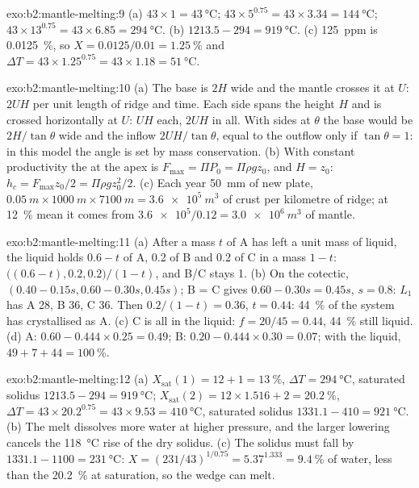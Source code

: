 \begin{solution}{exo:b2:mantle-melting:9}
(a) $43\times1 = \qty{43}{\celsius}$; $43\times5^{0.75} = 43\times3.34 =
\qty{144}{\celsius}$; $43\times13^{0.75} = 43\times6.85 = \qty{294}{\celsius}$.
(b) $1213.5 - 294 = \qty{919}{\celsius}$. (c) \qty{125}{ppm} is
\qty{0.0125}{\percent}, so $X = 0.0125/0.01 = \qty{1.25}{\percent}$ and $\Delta T =
43\times1.25^{0.75} = 43\times1.18 = \qty{51}{\celsius}$.
\end{solution}

\begin{solution}{exo:b2:mantle-melting:10}
(a) The base is $2H$ wide and the mantle crosses it at $U$: $2UH$ per unit length
of ridge and time. Each side spans the height $H$ and is crossed horizontally at
$U$: $UH$ each, $2UH$ in all. With sides at $\theta$ the base would be
$2H/\tan\theta$ wide and the inflow $2UH/\tan\theta$, equal to the outflow only if
$\tan\theta = 1$: in this model the angle is set by mass conservation. (b) With
constant productivity the  at the apex is $F_{\max} = \Pi P_0 = \Pi\rho
g z_0$, and $H = z_0$: $h_c = F_{\max}z_0/2 = \Pi\rho g z_0^2/2$. (c) Each year
\qty{50}{mm} of new plate, $\qty{0.05}{m}\times\qty{1000}{m}\times\qty{7100}{m} =
\qty{3.6e5}{m^3}$ of crust per kilometre of ridge; at \qty{12}{\percent} mean  it comes from $\num{3.6e5}/0.12 = \qty{3.0e6}{m^3}$ of mantle.
\end{solution}

\begin{solution}{exo:b2:mantle-melting:11}
(a) After a mass $t$ of A has left a unit mass of liquid, the liquid holds $0.6 -
t$ of A, 0.2 of B and 0.2 of C in a mass $1 - t$: $\big((0.6 - t), 0.2,
0.2\big)/(1 - t)$, and B/C stays 1. (b) On the cotectic, $(0.40 - 0.15s, 0.60 -
0.30s, 0.45s)$; B = C gives $0.60 - 0.30s = 0.45s$, $s = 0.8$: $L_1$ has A 28, B
36, C 36. Then $0.2/(1 - t) = 0.36$, $t = 0.44$: \qty{44}{\percent} of the system has
crystallised as A. (c) C is all in the liquid: $f = 20/45 = 0.44$,
\qty{44}{\percent} still liquid. (d) A: $0.60 - 0.444\times0.25 = 0.49$; B: $0.20 -
0.444\times0.30 = 0.07$; with the liquid, $49 + 7 + 44 = \qty{100}{\percent}$.
\end{solution}

\begin{solution}{exo:b2:mantle-melting:12}
(a) $X_{\mathrm{sat}}(1) = 12 + 1 = \qty{13}{\percent}$, $\Delta T =
\qty{294}{\celsius}$, saturated solidus $1213.5 - 294 = \qty{919}{\celsius}$;
$X_{\mathrm{sat}}(2) = 12\times1.516 + 2 = \qty{20.2}{\percent}$, $\Delta T =
43\times20.2^{0.75} = 43\times9.53 = \qty{410}{\celsius}$, saturated solidus $1331.1
- 410 = \qty{921}{\celsius}$. (b) The melt dissolves more water at higher pressure,
and the larger lowering cancels the \qty{118}{\celsius} rise of the dry solidus.
(c) The solidus must fall by $1331.1 - 1100 = \qty{231}{\celsius}$: $X =
(231/43)^{1/0.75} = 5.37^{1.333} = \qty{9.4}{\percent}$ of water, less than the
\qty{20.2}{\percent} at saturation, so the wedge can melt.
\end{solution}

